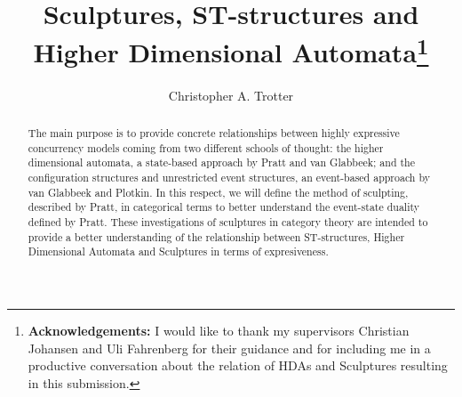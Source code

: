\documentclass[submission,copyright,creativecommons]{eptcs}
\begin{document}
\title{Sculptures, ST-structures and Higher Dimensional Automata\thanks{\textbf{Acknowledgements:} I would like to thank my supervisors Christian Johansen and Uli Fahrenberg for their guidance and for including me in a productive conversation about the relation of HDAs and Sculptures resulting in this submission.}}

\author{Christopher A. Trotter %
}
\def\titlerunning{Sculptures, ST-structures and HDAs}
\def\authorrunning{C.A.~Trotter}
% 
% 


\maketitle

\begin{abstract}
	\noindent The main purpose is to provide concrete relationships between highly expressive concurrency models coming from two different schools of thought: the higher dimensional automata, a state-based approach by Pratt and van Glabbeek; and the configuration structures and unrestricted event structures, an event-based approach by van Glabbeek and Plotkin. In this respect, we will define the method of sculpting, described by Pratt, in categorical terms to better understand the event-state duality defined by Pratt. These investigations of sculptures in category theory are intended to provide a better understanding of the relationship between ST-structures, Higher Dimensional Automata and Sculptures in terms of expresiveness. 
\end{abstract}
\end{document}
